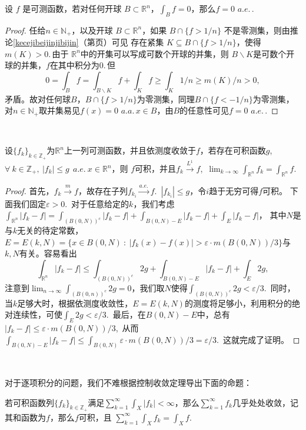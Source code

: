 \documentclass[color=green,thmcnt=section,lang=cn,12pt]{elegantbook}
\numberwithin{equation}{section}%
\numberwithin{figure}{section}%
\newcommand{\RR}{\mathbb{R}}
\renewcommand{\RN}{\RR^n}
\newcommand{\ZZ}{\mathbb{Z}}
\newcommand{\ee}{\varepsilon}
\newcommand{\any}{\forall \ }
\newcommand{\csf}[1]{\{#1_k\}_{k\in \ZZ_+}} %
\newcommand{\cs}[1]{\sum_{#1=1}^{\infty}} %
\newcommand{\p}[1]{（第\pageref{#1}页）}
\newcommand{\refp}[1]{\ref{#1}\p{#1}}
\begin{document}
\begin{proposition}
    设 $f$ 是可测函数，若对任何开球 $B\subset \mathbb{R}^{n}$，$\int_B f=0$，那么$f=0\,\,a.e.\,$.
\end{proposition}
\begin{proof}
    任给$n\in\mathbb{N}_+$，以及开球 $B\subset\mathbb{R}^{n}$，如果 $B\cap \{f>1/n\}$ 不是零测集，则由推论\refp{kecejibeijinjibijin}可见
    存在紧集 $K\subseteq B\cap\{f>1/n\}$，使得 $m(K)>0$.\,由于 $\mathbb{R}^{n}$中的开集可以写成可数个开球的并集，则
    $B\backslash K$是可数个开球的并集，$f$在其中积分为0.\,但$$
    0=\int_B f = \int_{B\backslash K}f+\int_K f\geq \int_K 1/n\geq m(K)/n>0,
    $$
矛盾。故对任何球$B$，$B\cap \{f>1/n\}$为零测集，同理$B\cap \{f<-1/n\}$为零测集，对$n\in\mathbb{N}_+$取并集易见$f(x)=0\,\,a.a.\,x\in B$，由$B$的任意性可见$f=0\,\,a.e.\,$.
\end{proof}
\ 


\begin{proposition}[依测度收敛的控制收敛定理]
    设$\csf{f}$为$\RN$上一列可测函数，并且依测度收敛于$f$，若存在可积函数$g$,\ $\any k\in\ZZ_+,\ |f_k|\leq g\ \ a.e.\ x\in\RN$，则
    $f$可积，并且$f_k\xrightarrow{L^1}f$,\ $\lim_{k\to\infty}\int_{\RN}f_k=\int_{\RN}f$.\ 
\end{proposition}
\begin{proof}
    首先，$f_k\xrightarrow{m}f$，故存在子列$f_{k_i}\xrightarrow{a.e.}f$.\ $|f_{k_i}|\leq g$，令$i$趋于无穷可得$f$可积。
    下面我们固定$\ee>0$.\ 
    对于任意给定的$k$，我们考虑$\int_{\RN}|f_k-f|=\int_{(B(0,N))^c}|f_k-f|+\int_{B(0,N)-E}|f_k-f|+\int_{E}|f_k-f|$，
    其中$N$是与$k$无关的待定常数，$E=E(k,N)=\{x\in B(0,N)\ :\ |f_k(x)-f(x)|>\ee\cdot m(B(0,N))/3\}$与$k,N$有关。容易看出
    \begin{equation*}
        \int_{\RN}|f_k-f|\leq \int_{(B(0,N))^c}2g+\int_{B(0,N)-E}|f_k-f|+\int_{E}2g,
    \end{equation*}
    注意到$\lim_{n\to\infty}\int_{(B(0,n))^c}2g=0$，我们取$N$使得$\int_{(B(0,N))^c}2g<\ee/3$.\ 
    同时，当$k$足够大时，根据依测度收敛性，$E=E(k,N)$的测度将足够小，利用积分的绝对连续性，可使$\int_{E}2g<\ee/3$.\ 最后，在$B(0,N)-E$中，总有
    $|f_k-f|\leq \ee\cdot m(B(0,N))/3$,\ 从而$\int_{B(0,N)-E}|f_k-f|\leq \int_{B(0,N)}\ee\cdot m(B(0,N))/3=\ee/3$.\ 这就完成了证明。
\end{proof}
\ 


对于逐项积分的问题，我们不难根据控制收敛定理导出下面的命题：
\begin{proposition}
    若可积函数列$\csf{f}$满足$\cs{k}\int_X|f_k|<\infty$，那么$\cs{k}f_k$几乎处处收敛，记其和函数为$f$，那么$f$可积，且
    $\cs{k}\int_Xf_k=\int_Xf$.\ 
\end{proposition}
\end{document}
